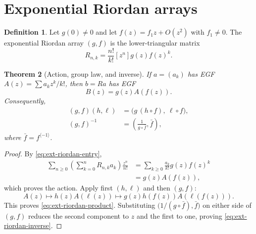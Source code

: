 \documentclass[11pt,a4paper,oneside,openany]{book}
\newtheorem{theorem}{Theorem}[chapter]
\theoremstyle{definition}
\newtheorem{definition}[theorem]{Definition}
\theoremstyle{remark}
\begin{document}
\section{Exponential Riordan arrays}

\begin{definition}
Let \(g(0)\ne0\) and let \(f(z)=f_1z+O(z^2)\) with \(f_1\ne0\).  The
exponential Riordan array \((g,f)\) is the lower-triangular matrix
\begin{equation}\label{eq:ext-riordan-entry}
 R_{n,k}=\frac{n!}{k!}[z^n]g(z)f(z)^k.
\end{equation}
\end{definition}

\begin{theorem}[Action, group law, and inverse]
If \(a=(a_k)\) has EGF \(A(z)=\sum a_kz^k/k!\), then \(b=Ra\) has EGF
\begin{equation}\label{eq:ext-riordan-action}
 B(z)=g(z)A(f(z)).
\end{equation}
Consequently,
\begin{align}
 (g,f)(h,\ell)&=\bigl(g\,(h\circ f),\ \ell\circ f\bigr),
 \label{eq:ext-riordan-product}\\
 (g,f)^{-1}&=\left(\frac1{g\circ\bar f},\bar f\right),
 \label{eq:ext-riordan-inverse}
\end{align}
where \(\bar f=f^{\langle-1\rangle}\).
\end{theorem}
\begin{proof}
By \eqref{eq:ext-riordan-entry},
\begin{align*}
 \sum_{n\ge0}\left(\sum_{k=0}^nR_{n,k}a_k\right)\frac{z^n}{n!}
 &=\sum_{k\ge0}\frac{a_k}{k!}g(z)f(z)^k\\
 &=g(z)A(f(z)),
\end{align*}
which proves the action.  Apply first \((h,\ell)\) and then \((g,f)\):
\[
 A(z)\longmapsto h(z)A(\ell(z))
 \longmapsto g(z)h(f(z))A(\ell(f(z))).
\]
This proves \eqref{eq:ext-riordan-product}.  Substituting
\(\bigl(1/(g\circ\bar f),\bar f\bigr)\) on either side of \((g,f)\) reduces
the second component to \(z\) and the first to one, proving
\eqref{eq:ext-riordan-inverse}.
\end{proof}
\end{document}
